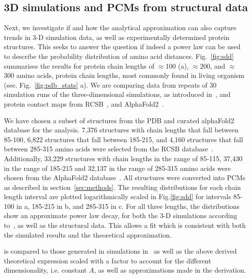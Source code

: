 \documentclass[
reprint,
twocolumn,
amsmath,amssymb,superscriptaddress,aps,
pre]{revtex4-1}
\begin{document}
\subsection{3D simulations and PCMs from structural data }
Next, we investigate if and how the analytical approximation can also capture trends in 3-D simulation data, as well as experimentally determined protein structures. This seeks to answer the question if indeed a power law can be used to describe the probability distribution of amino acid distances. Fig.~\ref{fig:sdd} summarises the results for protein chain lengths of $\approx$100 (a), $\approx$200, and $\approx$ 300 amino acids, protein chain lengths, most commonly found in living organism (see. Fig.~\ref{fig:pdb_stats} a). We are comparing data from repeats of 30 simulation runs of the three-dimensional simulations, as introduced in~\cite{molkenthin2020self}, and protein contact maps from RCSB~\cite{}, and AlphaFold2~\cite{}. 

We have chosen a subset of structures from the PDB and curated alphaFold2 database for the analysis. 7,376 structures with chain lengths that fall between 85-100, 6,822 structures that fall between 185-215, and 4,160 structures that fall between 285-315 amino acids were selected from the RCSB database~\cite{PDB}. Additionally, 33,229 structures with chain lengths in the range of 85-115, 37,430 in the range of 185-215 and 32,137 in the range of 285-315 amino acids were chosen from the AlphaFold2 database~\cite{}. All structures were converted into PCMs as described in section~\ref{sec:methods}. 
The resulting distributions for each chain length interval are plotted logarithmically scaled in Fig.\ref{fig:sdd} for intervals 85-100 in a, 185-215 in b, and 285-315 in c. 
For all three lengths, the distributions show an approximate power law decay, for both the 3-D simulations according to~\cite{molkenthin2020self}, as well as the structural data. This allows a fit  which is consistent with both the simulated results and the theoretical approximation.

is compared to those generated in simulations in~\cite{molkenthin2020self} as well as the above derived theoretical expression scaled with a factor to account for the different dimensionality, i.e. constant $A$, as well as approximations made in the derivation.
\end{document}
